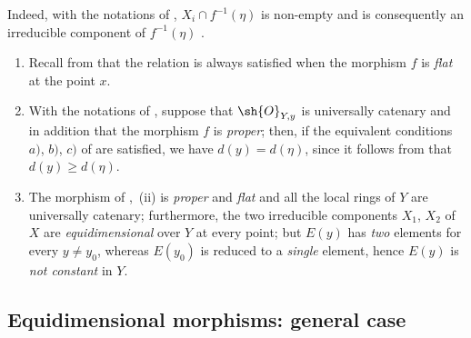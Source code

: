 Indeed, with the notations of , $X_i\cap f^{-1}(\eta)$ is non-empty and is consequently an irreducible component of $f^{-1}(\eta)$ .

\begin{remarks}[13.2.12]
\label{IV.13.2.12}
\begin{enumerate}[label=(\roman*)]
  \item Recall from  that the relation  is always satisfied when the morphism $f$ is \emph{flat} at the point $x$.
  \item With the notations of , suppose that $\sh{O}_{Y,y}$ is universally catenary and in addition that the morphism $f$ is \emph{proper}; then, if the equivalent conditions $a)$, $b)$, $c)$ of  are satisfied, we have $d(y)=d(\eta)$, since it follows from  that $d(y)\geq d(\eta)$.
  \item The morphism of ,~(ii) is \emph{proper} and \emph{flat} and all the local rings of $Y$ are universally catenary; furthermore, the two irreducible components $X_1$, $X_2$ of $X$ are \emph{equidimensional} over $Y$ at every point; but $E(y)$ has \emph{two} elements for every $y\neq y_0$, whereas $E(y_0)$ is reduced to a \emph{single} element, hence $E(y)$ is \emph{not constant} in $Y$.
\end{enumerate}
\end{remarks}

\subsection{Equidimensional morphisms: general case}
\label{subsection:IV.13.3}

